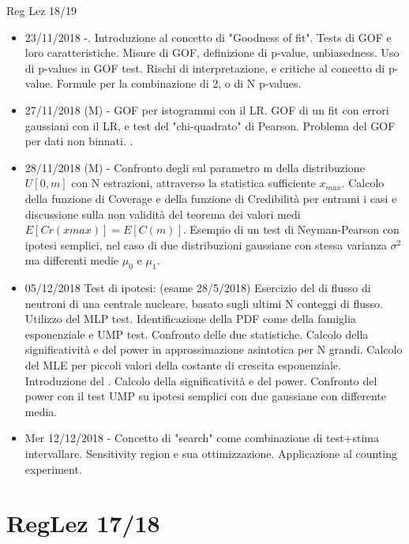 \begin{frame}[allowframebreaks]{Reg Lez 18/19}
\begin{itemize}
\item 23/11/2018 -. Introduzione al concetto di "Goodness of fit". Tests di GOF e loro caratteristiche. Misure di GOF, definizione di p-value, unbiasedness. Uso di p-values in GOF test. Rischi di interpretazione, e critiche al concetto di p-value. Formule per la combinazione di 2, o di N p-values.  
\item 27/11/2018 (M) - GOF per istogrammi con il LR. GOF di un fit con errori gaussiani con il LR, e test del "chi-quadrato" di Pearson. Problema del GOF per dati non binnati. .
\item 28/11/2018 (M) - Confronto degli  sul parametro m della distribuzione $U[0,m]$ con N estrazioni, attraverso la statistica sufficiente $x_{max}$. Calcolo della funzione di Coverage e della funzione di Credibilità per entrami i casi e discussione sulla non validità del teorema dei valori medi $E[Cr(xmax)] = E[C(m)]$. Esempio di un test di Neyman-Pearson con ipotesi semplici, nel caso di due distribuzioni gaussiane con stessa varianza $\sigma^2$ ma differenti medie $\mu_0$ e $\mu_1$.
\item  05/12/2018 Test di ipotesi: (esame 28/5/2018) Esercizio del  di flusso di neutroni di una centrale nucleare, basato sugli ultimi N conteggi di flusso. Utilizzo del MLP test. Identificazione della PDF come della famiglia esponenziale e UMP test. Confronto delle due statistiche. Calcolo della significatività e del power in approssimazione asintotica per N grandi. Calcolo del MLE per piccoli valori della costante di crescita esponenziale. Introduzione del . Calcolo della significatività e del power. Confronto del power con il test UMP su ipotesi semplici con due gaussiane con differente media.
\item Mer 12/12/2018 - Concetto di "search" come combinazione di test+stima intervallare. Sensitivity region e sua ottimizzazione. Applicazione al counting experiment.
    \end{itemize}
\end{frame}

\section{RegLez 17/18}

